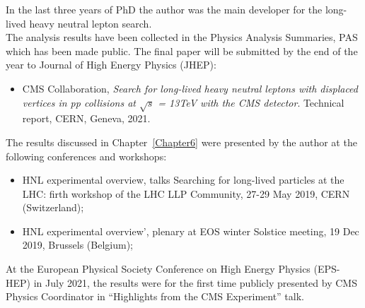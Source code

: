 In the last three years of PhD the author was the main developer for the
long-lived heavy neutral lepton search. \\
The analysis results have been collected in the Physics Analysis
Summaries, PAS which has been made public. The final paper will be
submitted by the end of the year to Journal
of High Energy Physics (JHEP):
\begin{itemize}
\setlength\itemsep{-0.1em}
\item CMS Collaboration, \emph{Search for long-lived heavy neutral leptons with displaced vertices in pp collisions at $\sqrt{s}$ =
13TeV with the CMS detector}. Technical report, CERN, Geneva, 2021.
\end{itemize}

The results discussed in Chapter~\ref{Chapter6} were presented by the author at the following
conferences and workshops:

\begin{itemize}
\setlength\itemsep{-0.1em}
\item HNL experimental overview, talks Searching for long-lived
  particles at the LHC: firth workshop of the LHC LLP Community, 27-29
  May 2019, CERN (Switzerland);
\item HNL experimental overview', plenary at EOS winter Solstice
  meeting, 19 Dec 2019, Brussels (Belgium);
\end{itemize}

At the European Physical Society Conference on High Energy Physics
(EPS-HEP) in July 2021, the results were for the first time publicly
presented by CMS Physics Coordinator in ``Highlights from the CMS
Experiment'' talk.


